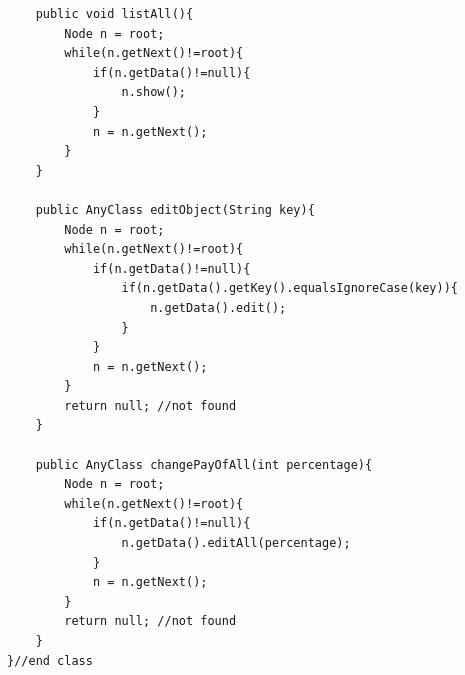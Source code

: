 \documentclass[12pt]{article}
\begin{document}
\begin{lstlisting}
    public void listAll(){
        Node n = root;
        while(n.getNext()!=root){
            if(n.getData()!=null){
                n.show();
            }
            n = n.getNext();
        }
    }

    public AnyClass editObject(String key){
        Node n = root;
        while(n.getNext()!=root){
            if(n.getData()!=null){
                if(n.getData().getKey().equalsIgnoreCase(key)){                   
                    n.getData().edit();                 
                }
            }
            n = n.getNext();
        }
        return null; //not found
    }

    public AnyClass changePayOfAll(int percentage){
        Node n = root;
        while(n.getNext()!=root){
            if(n.getData()!=null){
                n.getData().editAll(percentage);
            }
            n = n.getNext();
        }
        return null; //not found
    }
}//end class

\end{lstlisting}
\newpage
\end{document}
